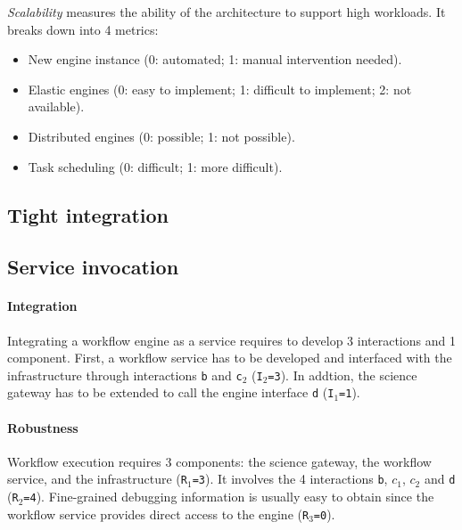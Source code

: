 \documentclass[preprint,3p,twocolumn]{elsarticle}
\begin{document}
\emph{Scalability} measures the ability of the architecture to support
high workloads. It breaks down into 4 metrics:
\begin{itemize}[itemsep=0cm]
\item New engine instance (0: automated; 1: manual intervention needed).
\item Elastic engines (0: easy to implement; 1: difficult to
  implement; 2: not available).
\item Distributed engines (0: possible; 1: not possible).
\item Task scheduling (0: difficult; 1: more difficult).
\end{itemize}




\subsection{Tight integration}

\subsection{Service invocation} 

\paragraph{Integration} Integrating a workflow engine as a service
requires to develop 3 interactions and 1 component. First, a workflow
service has to be developed and interfaced with the infrastructure
through interactions \texttt{b} and \texttt{c$_2$}
(\texttt{I$_2$=3}). In addtion, the science gateway has to be extended
to call the engine interface \texttt{d} (\texttt{I$_1$=1}).

\paragraph{Robustness} Workflow execution requires 3 components: the
science gateway, the workflow service, and the infrastructure
(\texttt{R$_1$=3}). It involves the 4 interactions \texttt{b},
\texttt{$c_1$}, \texttt{$c_2$} and \texttt{d}
(\texttt{R$_2$=4}). Fine-grained debugging information is usually easy
to obtain since the workflow service provides direct access to the
engine (\texttt{R$_3$=0}).
\end{document}
